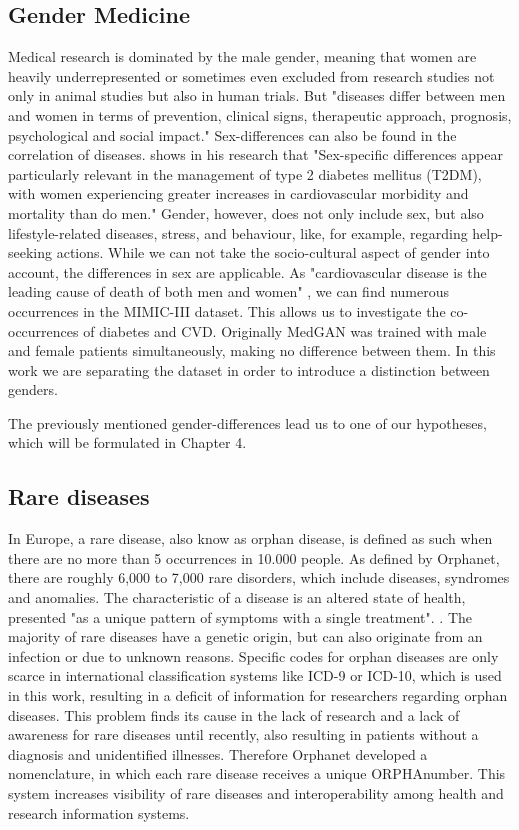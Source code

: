 \documentclass[11pt, a4paper]{book}
\begin{document}
\subsection{Gender Medicine}
Medical research is dominated by the male gender, meaning that women are heavily underrepresented or sometimes even excluded from research studies not only in animal studies but also in human trials. \cite{baggio2013gender} 
But "diseases  differ  between  men  and  women  in  terms  of  prevention,  clinical  signs,  therapeutic  approach,  prognosis,  psychological  and  social  impact." \cite{baggio2013gender}
Sex-differences can also be found in the correlation of diseases. \cite{kautzky2010sex} shows in his research that "Sex-specific differences appear particularly relevant in the management of type 2 diabetes mellitus (T2DM), with women experiencing greater increases in cardiovascular morbidity and mortality than do men." \cite{kautzky2010sex}
Gender, however, does not only include sex, but also lifestyle-related diseases, stress, and behaviour, like, for example, regarding help-seeking actions.
While we can not take the socio-cultural aspect of gender into account, the differences in sex are applicable.
As "cardiovascular disease is the leading cause of death of both men and women" \cite{arain2009sex}, we can find numerous occurrences in the MIMIC-III dataset. This allows us to investigate the co-occurrences of diabetes and CVD.
Originally MedGAN was trained with male and female patients simultaneously, making no difference between them. In this work we are separating the dataset in order to introduce a distinction between genders.

The previously mentioned gender-differences lead us to one of our hypotheses, which will be formulated in Chapter 4.

\subsection{Rare diseases}
In Europe, a rare disease, also know as orphan disease, is defined as such when there are no more than 5 occurrences in 10.000 people. As defined by Orphanet, there are roughly 6,000 to 7,000 rare disorders, which include diseases, syndromes and anomalies. The characteristic of a disease is an altered state of health, presented "as a unique pattern of symptoms with a single treatment". \cite{Orphanet}. The majority of rare diseases have a genetic origin, but can also originate from an infection or due to unknown reasons. \cite{Orphanet} Specific codes for orphan diseases are only scarce in international classification systems like ICD-9 or ICD-10, which is used in this work, resulting in a deficit of information  for researchers regarding orphan diseases. This problem finds its cause in the lack of research and a lack of awareness for rare diseases until recently, also resulting in patients without a diagnosis and unidentified illnesses. \cite{Orphanet}
Therefore Orphanet developed a nomenclature, in which each rare disease receives a unique ORPHAnumber. This system increases visibility of rare diseases and interoperability among health and research information systems. \cite{Orphanet}
\end{document}
